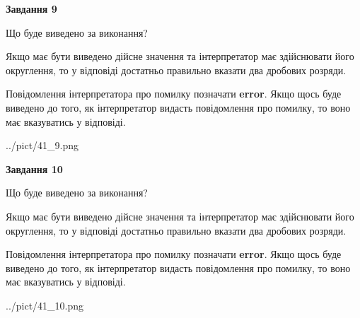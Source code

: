 \documentclass[12pt, ukrainian]{article}
\begin{document}
{\begin {Large}
{\begin {center}\textbf{Завдання 9}\end {center}}\par
Що буде виведено за виконання? \par

Якщо має бути виведено дійсне значення та інтерпретатор має здійснювати його округлення, 
то у відповіді достатньо правильно вказати два дробових розряди.

Повідомлення інтерпретатора про помилку позначати \textbf{error}.
Якщо щось буде виведено до того, як інтерпретатор видасть повідомлення про помилку, 
то воно має вказуватись у відповіді. \par

\begin{center}
	{../pict/41_9.png}
\end{center}
\newpage

{\begin {center}\textbf{Завдання 10}\end {center}}\par
Що буде виведено за виконання? \par

Якщо має бути виведено дійсне значення та інтерпретатор має здійснювати його округлення, 
то у відповіді достатньо правильно вказати два дробових розряди.

Повідомлення інтерпретатора про помилку позначати \textbf{error}.
Якщо щось буде виведено до того, як інтерпретатор видасть повідомлення про помилку, 
то воно має вказуватись у відповіді. \par

\begin{center}
	{../pict/41_10.png}
\end{center}
\newpage

\end {Large}}
\end{document}
